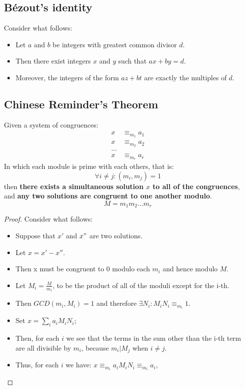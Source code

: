 \subsection{Bézout's identity}
\begin{theorem}
    Consider what follows:
    \begin{itemize}
        \item Let $a$ and $b$ be integers with greatest common divisor $d$.
        \item Then there exist integers $x$ and $y$ such that $ax + by = d$.
        \item Moreover, the integers of the form $az + bt$ are exactly the multiples of $d$.
    \end{itemize}
\end{theorem}

\subsection{Chinese Reminder's Theorem}
\begin{theorem}
    Given a system of congruences:
    \begin{align*}
        x & \equiv_{m_{1}} a_{1} \\
        x & \equiv_{m_{2}} a_{2} \\
        \dots \\
        x & \equiv_{m_{r}} a_{r}
    \end{align*}
    In which each module is prime with each others, that is:
    \[
    \forall i \neq j: (m_{i}, m_{j}) = 1
    \]
    then \textbf{there exists a simultaneous solution $x$ to all of the congruences}, and \textbf{any two solutions are congruent to one another modulo}.
    \[M = m_{1}m_{2}\dots m_{r}\]
\end{theorem}

\begin{proof}
    Consider what follows:
    \begin{itemize}
        \item Suppose that $x'$ and $x"$ are two solutions.
        \item Let $x = x' - x''$.
        \item Then x must be congruent to $0$ modulo each $m_{i}$ and hence modulo $M$.
        \item Let $M_{i} = \frac{M}{m_{i}}$, to be the product of all of the moduli except for the i-th.
        \item Then $GCD(m_{i}, M_{i}) = 1$ and therefore $\exists N_{i}: M_{i}N_{i} \equiv_{m_{i}} 1$.
        \item Set $x = \sum_{i}a_{i}M_{i}N_{i}$;
        \item Then, for each $i$ we see that the terms in the sum other than the i-th term are all divisible by $m_{i}$, because $m_{i} | M_{j}$ when $i \neq j$.
        \item Thus, for each $i$ we have: $x \equiv_{m_{i}} a_{i}M_{i}N_{i} \equiv_{m_{i}} a_{i}$,
    \end{itemize}
\end{proof}

